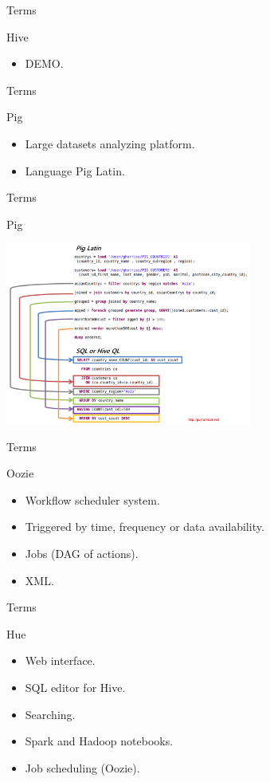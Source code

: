 \begin{frame}{Terms}
  \begin{block}{Hive}
    \begin{itemize}
      \item DEMO.
    \end{itemize}
  \end{block}
\end{frame}

\begin{frame}{Terms}
  \begin{block}{Pig}
    \begin{itemize}
      \item Large datasets analyzing platform.
      \item Language Pig Latin.
    \end{itemize}
  \end{block}
\end{frame}

\begin{frame}{Terms}
  \begin{block}{Pig}
    \begin{center}
      \includegraphics[height=6cm]{img/pig.png}
    \end{center}
  \end{block}
\end{frame}

\begin{frame}{Terms}
  \begin{block}{Oozie}
    \begin{itemize}
      \item Workflow scheduler system.
      \item Triggered by time, frequency or data availability.
      \item Jobs (DAG of actions).
      \item XML.
    \end{itemize}
  \end{block}
\end{frame}

\begin{frame}{Terms}
  \begin{block}{Hue}
    \begin{itemize}
      \item Web interface. 
      \item SQL editor for Hive.
      \item Searching.
      \item Spark and Hadoop notebooks.
      \item Job scheduling (Oozie).
    \end{itemize}
  \end{block}
\end{frame}

